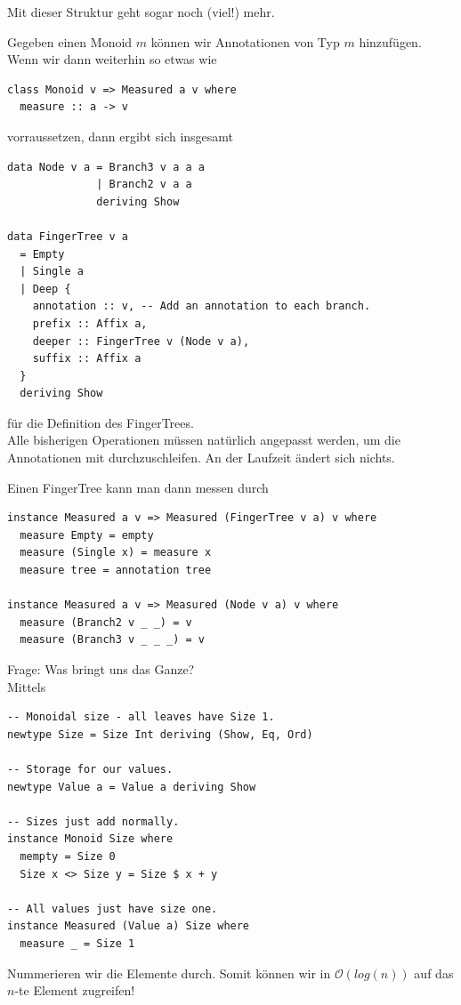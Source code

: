 \documentclass{beamer}
\begin{document}
\begin{frame}[fragile]
Mit dieser Struktur geht sogar noch (viel!) mehr.\\\par\pause
Gegeben einen Monoid $m$ können wir Annotationen von Typ $m$ hinzufügen.\\\pause
Wenn wir dann weiterhin so etwas wie
\begin{verbatim}
class Monoid v => Measured a v where
  measure :: a -> v
\end{verbatim}
vorraussetzen, dann ergibt sich insgesamt
\end{frame}

\begin{frame}[fragile]
\begin{verbatim}
data Node v a = Branch3 v a a a
              | Branch2 v a a
              deriving Show
            
data FingerTree v a 
  = Empty
  | Single a
  | Deep {
    annotation :: v, -- Add an annotation to each branch.
    prefix :: Affix a,
    deeper :: FingerTree v (Node v a),
    suffix :: Affix a
  }
  deriving Show
\end{verbatim}
für die Definition des FingerTrees.\\\pause
Alle bisherigen Operationen müssen natürlich angepasst werden, um die Annotationen mit durchzuschleifen. An der Laufzeit ändert sich nichts.
\end{frame}

\begin{frame}[fragile]
Einen FingerTree kann man dann messen durch
\begin{verbatim}
instance Measured a v => Measured (FingerTree v a) v where
  measure Empty = empty
  measure (Single x) = measure x
  measure tree = annotation tree

instance Measured a v => Measured (Node v a) v where
  measure (Branch2 v _ _) = v
  measure (Branch3 v _ _ _) = v
\end{verbatim}
\end{frame}

\begin{frame}[fragile]
Frage: Was bringt uns das Ganze?\\\pause
Mittels
\begin{verbatim}
-- Monoidal size - all leaves have Size 1.
newtype Size = Size Int deriving (Show, Eq, Ord)

-- Storage for our values.
newtype Value a = Value a deriving Show

-- Sizes just add normally.
instance Monoid Size where
  mempty = Size 0
  Size x <> Size y = Size $ x + y
  
-- All values just have size one.
instance Measured (Value a) Size where
  measure _ = Size 1
\end{verbatim}
Nummerieren wir die Elemente durch. Somit können wir in $\mathcal{O}(log(n))$ auf das $n$-te Element zugreifen!
\end{frame}
\end{document}

